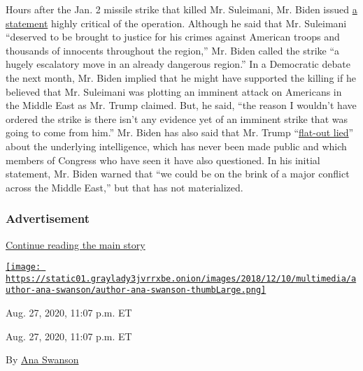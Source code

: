 Hours after the Jan. 2 missile strike that killed Mr. Suleimani, Mr.
Biden issued
\href{https://slack-redir.net/link?url=https\%3A\%2F\%2Ftwitter.com\%2FJoeBiden\%2Fstatus\%2F1212954848666234880\%2Fphoto\%2F1}{a
statement} highly critical of the operation. Although he said that Mr.
Suleimani ``deserved to be brought to justice for his crimes against
American troops and thousands of innocents throughout the region,'' Mr.
Biden called the strike ``a hugely escalatory move in an already
dangerous region.'' In a Democratic debate the next month, Mr. Biden
implied that he might have supported the killing if he believed that Mr.
Suleimani was plotting an imminent attack on Americans in the Middle
East as Mr. Trump claimed. But, he said, ``the reason I wouldn't have
ordered the strike is there isn't any evidence yet of an imminent strike
that was going to come from him.'' Mr. Biden has also said that Mr.
Trump
``\href{https://slack-redir.net/link?url=https\%3A\%2F\%2Fwww.desmoinesregister.com\%2Fstory\%2Fnews\%2Felections\%2Fpresidential\%2Fcaucus\%2F2020\%2F01\%2F14\%2Fdemocratic-debate-transcript-what-the-candidates-said-quotes\%2F4460789002\%2F}{flat-out
lied}'' about the underlying intelligence, which has never been made
public and which members of Congress who have seen it have also
questioned. In his initial statement, Mr. Biden warned that ``we could
be on the brink of a major conflict across the Middle East,'' but that
has not materialized.

\hypertarget{advertisement-5}{%
\subsubsection{Advertisement}\label{advertisement-5}}

\protect\hyperlink{after-dfp-ad-mid6}{Continue reading the main story}

\href{https://www.nytimes3xbfgragh.onion/by/ana-swanson}{\texttt{[image: https://static01.graylady3jvrrxbe.onion/images/2018/12/10/multimedia/author-ana-swanson/author-ana-swanson-thumbLarge.png]}}

Aug. 27, 2020, 11:07 p.m. ET

Aug. 27, 2020, 11:07 p.m. ET

By \href{https://www.nytimes3xbfgragh.onion/by/ana-swanson}{Ana Swanson}

